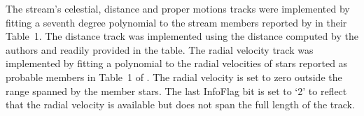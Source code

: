 The stream's celestial, distance and proper motions tracks were implemented by fitting a seventh degree polynomial to the stream members reported by \citet{Ibata2021} in their Table~1. The distance track was implemented using the distance computed by the authors and readily provided in the table.  The radial velocity track was implemented by fitting a polynomial to the radial velocities of stars reported as probable members in Table~1 of \citet{Ibata2019}. The radial velocity is set to zero outside the range spanned by the member stars. The last InfoFlag bit is set to `2' to reflect that the radial velocity is available but does not span the full length of the track.
